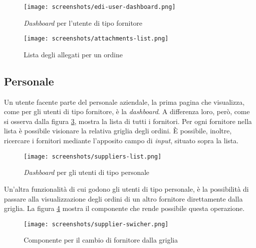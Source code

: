 \begin{figure}[!ht]
  \begin{center}
    \texttt{[image: screenshots/edi-user-dashboard.png]}
    \caption{\emph{Dashboard} per l'utente di tipo fornitore}
    \label{fig:dashboard}
  \end{center}
\end{figure}

\newpage
\begin{figure}[!ht]
  \texttt{[image: screenshots/attachments-list.png]}
  \caption{Lista degli allegati per un ordine}
  \label{fig:attachments-list}
  \centering
\end{figure}

\subsection{Personale}
Un utente facente parte del personale aziendale, la prima pagina che visualizza, come per gli utenti di tipo fornitore, è la \emph{dashboard}.
A differenza loro, però, come si osserva dalla figura \ref{fig:lago-dashboard}, mostra la lista di tutti i fornitori.
Per ogni fornitore nella lista è possibile visionare la relativa griglia degli ordini.
È possibile, inoltre, ricercare i fornitori mediante l'apposito campo di \emph{input}, situato sopra la lista.

\newpage
\begin{figure}[!ht]
  \begin{center}
    \texttt{[image: screenshots/suppliers-list.png]}
    \caption{\emph{Dashboard} per gli utenti di tipo personale}
    \label{fig:lago-dashboard}
  \end{center}
\end{figure}

Un'altra funzionalità di cui godono gli utenti di tipo personale, è la possibilità di passare alla visualizzazione degli ordini di un altro fornitore direttamente dalla griglia.
La figura \ref{fig:supplier-swicher} mostra il componente che rende possibile questa operazione.

\begin{figure}[!ht]
  \begin{center}
    \texttt{[image: screenshots/supplier-swicher.png]}
    \caption{Componente per il cambio di fornitore dalla griglia}
    \label{fig:supplier-swicher}
  \end{center}
\end{figure}

